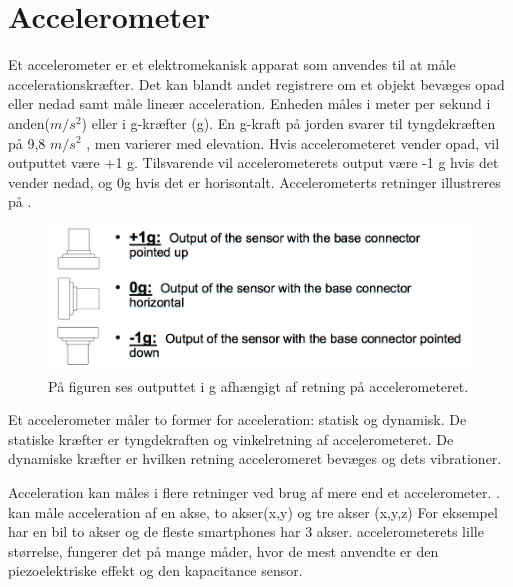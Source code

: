 \section{Accelerometer} 
Et accelerometer er et elektromekanisk apparat som anvendes til at måle accelerationskræfter. Det kan blandt andet registrere om et objekt bevæges opad eller nedad samt måle lineær acceleration\citep{Goodrich2013}. Enheden måles i meter per sekund i anden($m/s^2$) eller i g-kræfter (g). En g-kraft på jorden svarer til tyngdekræften på 9,8 $m/s^2$ , men varierer med elevation. \citep{Sparkfun}
Hvis accelerometeret vender opad, vil outputtet være +1 g. Tilsvarende vil accelerometerets output være -1 g hvis det vender nedad, og 0g hvis det er horisontalt. Accelerometerts retninger illustreres på . \citep{Instruments}

\begin{figure}[H]
	\centering
	\includegraphics[scale=0.25]{figures/bProblemloesning/g.png}
	\caption{På figuren ses outputtet i g afhængigt af retning på accelerometeret. \citep{Instruments}}
	\label{fig:g}
\end{figure}

Et accelerometer måler to former for acceleration: statisk og dynamisk. De statiske kræfter er tyngdekraften og  vinkelretning af accelerometeret. De dynamiske kræfter er hvilken retning acceleromeret bevæges og dets vibrationer. \citep{Sparkfun,Engineering, Goodrich2013}

 

 Acceleration kan måles i flere retninger ved brug af mere end et accelerometer. \citep{Sparkfun}. kan måle acceleration af en akse, to akser(x,y) og tre akser (x,y,z) For eksempel har en bil to akser og de fleste smartphones har 3 akser. \citep{Sparkfun}
 accelerometerets lille størrelse, fungerer det på mange måder, hvor de mest anvendte er den piezoelektriske effekt og den kapacitance sensor. 

